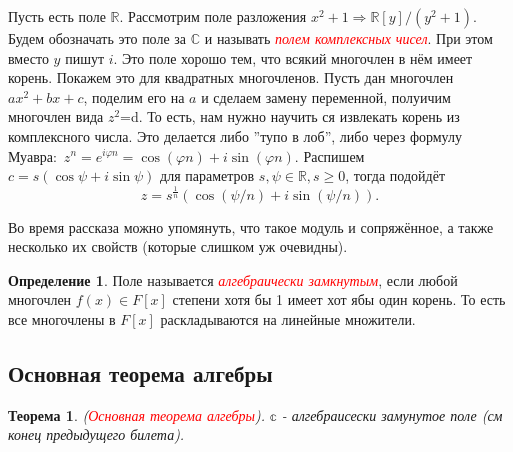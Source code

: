 \documentclass[a4paper,100pt]{article}
\theoremstyle{indented}
\newtheorem{theorem}{Теорема}
\theoremstyle{definition}
\newtheorem{defn}{Определение}
\theoremstyle{remark}
\begin{document}
Пусть есть поле $\mathbb{R}$. Рассмотрим поле разложения $x^2+1\Rightarrow \mathbb{R}[y]/(y^2+1)$. Будем обозначать это поле за $\mathbb{C}$ и называть \hypertarget{n38}{\textcolor{red}{\textit{полем комплексных чисел}}}. При этом вместо $y$ пишут $i$. Это поле хорошо тем, что всякий многочлен в нём имеет корень. Покажем это для квадратных многочленов. Пусть дан многочлен $ax^2+bx+c$, поделим его на $a$ и сделаем замену переменной, полуичим многочлен вида $z^2$=d. То есть, нам нужно научить ся извлекать корень из комплексного числа. Это делается либо ''тупо в лоб'', либо через формулу Муавра:\
$z^n=e^{i\varphi n}=\cos(\varphi n)+i\sin(\varphi n)$. Распишем $c=s(\cos\psi+i\sin\psi)$ для параметров $s, \psi\in\mathbb{R}, s\geq 0$, тогда подойдёт
\[
    z=s^{\frac1n}(\cos(\psi / n)+i\sin(\psi/n)).
\]

Во время рассказа можно упомянуть, что такое модуль и сопряжённое, а также несколько их свойств (которые слишком уж очевидны).

\begin{defn}
    Поле называется \hypertarget{n39}{\textcolor{red}{\textit{алгебраически замкнутым}}}, если любой многочлен $f(x)\in F[x]$ степени хотя бы 1 имеет хот ябы один корень. То есть все многочлены в $F[x]$ раскладываются на линейные множители.
\end{defn}

\resetall

\subsection{Основная теорема алгебры}

\begin{theorem}
    (\hypertarget{n40}{\textcolor{red}{\textit{Основная теорема алгебры}}}). $\mathbb{c}$ - алгебраисески замунутое поле (см конец предыдущего билета). 
\end{theorem}
\end{document}
